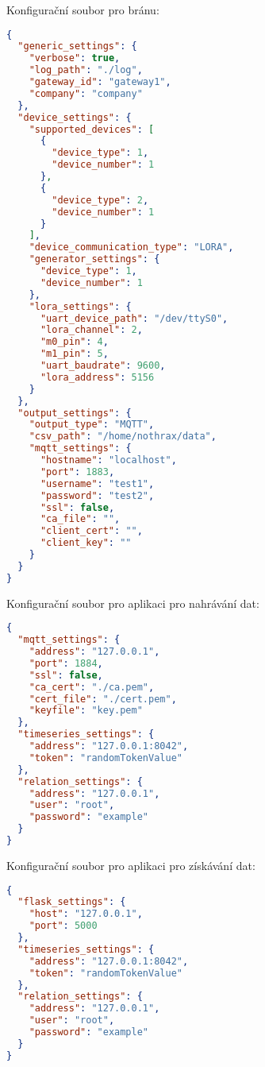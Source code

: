 
\listofappendices

\label{P_configs}
Konfigurační soubor pro bránu:
\begin{lstlisting}[language=json]
{
  "generic_settings": {
    "verbose": true,
    "log_path": "./log",
    "gateway_id": "gateway1",
    "company": "company"
  },
  "device_settings": {
    "supported_devices": [
      {
        "device_type": 1,
        "device_number": 1
      },
      {
        "device_type": 2,
        "device_number": 1
      }
    ],
    "device_communication_type": "LORA",
    "generator_settings": {
      "device_type": 1,
      "device_number": 1
    },
    "lora_settings": {
      "uart_device_path": "/dev/ttyS0",
      "lora_channel": 2,
      "m0_pin": 4,
      "m1_pin": 5,
      "uart_baudrate": 9600,
      "lora_address": 5156
    }
  },
  "output_settings": {
    "output_type": "MQTT",
    "csv_path": "/home/nothrax/data",
    "mqtt_settings": {
      "hostname": "localhost",
      "port": 1883,
      "username": "test1",
      "password": "test2",
      "ssl": false,
      "ca_file": "",
      "client_cert": "",
      "client_key": ""
    }
  }
}
\end{lstlisting}
Konfigurační soubor pro aplikaci pro nahrávání dat:
\begin{lstlisting}[language=json]
{
  "mqtt_settings": {
    "address": "127.0.0.1",
    "port": 1884,
    "ssl": false,
    "ca_cert": "./ca.pem",
    "cert_file": "./cert.pem",
    "keyfile": "key.pem"
  },
  "timeseries_settings": {
    "address": "127.0.0.1:8042",
    "token": "randomTokenValue"
  },
  "relation_settings": {
    "address": "127.0.0.1",
    "user": "root",
    "password": "example"
  }
}
\end{lstlisting}
Konfigurační soubor pro aplikaci pro získávání dat:
\begin{lstlisting}[language=json]
{
  "flask_settings": {
    "host": "127.0.0.1",
    "port": 5000
  },
  "timeseries_settings": {
    "address": "127.0.0.1:8042",
    "token": "randomTokenValue"
  },
  "relation_settings": {
    "address": "127.0.0.1",
    "user": "root",
    "password": "example"
  }
}
\end{lstlisting}


\label{P_zapojeni}





